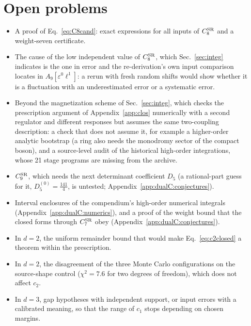 \documentclass[11pt,a4paper]{article}
\numberwithin{equation}{section}
\newcommand{\CSR}{C^{\rm SR}}
\begin{document}
\section{Open problems}\label{sec:open}
\begin{itemize}
\item A proof of Eq.~\eqref{eq:C8cand}: exact expressions for all inputs of $\CSR_8$ and a weight-seven certificate.
\item The cause of the low independent value of $\CSR_8$, which Sec.~\ref{sec:integ} indicates is the one in error
 and the re-derivation's own input comparison locates in $A_9[\varepsilon^0\ell^1]$: a rerun with fresh random shifts
 would show whether it is a fluctuation with an underestimated error or a systematic error.
\item Beyond the magnetization scheme of Sec.~\ref{sec:integ}, which checks the prescription argument of
 Appendix~\ref{app:clos} numerically with a second regulator and different responses but assumes the same two-coupling
 description: a check that does not assume it, for example a higher-order analytic bootstrap (a ring also needs the
 monodromy sector of the compact boson), and a source-level audit of the historical high-order integrations, whose 21
 stage programs are missing from the archive.
\item $\CSR_9$, which needs the next determinant coefficient $D_5$ (a rational-part guess for it,
 $D_5^{(0)}=\frac{141}{4}$, is untested; Appendix~\ref{app:dualC:conjectures}).
\item Interval enclosures of the compendium's high-order numerical integrals (Appendix~\ref{app:dualC:numerics}), and a
 proof of the weight bound that the closed forms through $\CSR_7$ obey (Appendix~\ref{app:dualC:conjectures}).
\item In $d=2$, the uniform remainder bound that would make Eq.~\eqref{eq:c2closed} a theorem within the prescription.
\item In $d=2$, the disagreement of the three Monte Carlo configurations on the source-shape control ($\chi^2=7.6$ for
 two degrees of freedom), which does not affect $c_2$.
\item In $d=3$, gap hypotheses with independent support, or input errors with a calibrated meaning, so that the range of
 $c_1$ stops depending on chosen margins.
\end{itemize}

\appendix
{}
\end{document}
